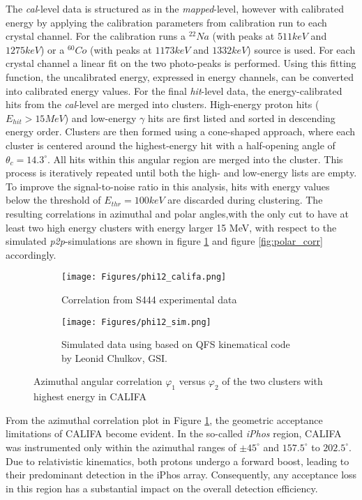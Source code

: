 The \textit{cal}-level data is structured as in the \textit{mapped}-level, however with calibrated energy by applying the calibration parameters from calibration run to each crystal channel.\newline
For the calibration runs a $^{22}Na$ (with peaks at $511keV$ and $1275keV$) or a $^{60}Co$ (with peaks at $1173keV$ and $1332keV$) source is used. For each crystal channel a linear fit on the two photo-peaks is performed. Using this fitting function, the uncalibrated energy, expressed in energy channels, can be converted into calibrated energy values.\newline
For the final \textit{hit}-level data, the energy-calibrated hits from the \textit{cal}-level are merged into clusters. High-energy proton hits ($E_{hit} > 15 MeV$) and low-energy $\gamma$ hits are first listed and sorted in descending energy order. Clusters are then formed using a cone-shaped approach, where each cluster is centered around the highest-energy hit with a half-opening angle of $\theta_c = 14.3^{\circ}$. All hits within this angular region are merged into the cluster. This process is iteratively repeated until both the high- and low-energy lists are empty. To improve the signal-to-noise ratio in this analysis, hits with energy values below the threshold of $E_{thr} = 100keV$ are discarded during clustering.\newline
The resulting correlations in azimuthal and polar angles,with the only cut to have at least two high energy clusters with energy larger 15 MeV, with respect to the simulated \textit{p2p}-simulations are shown in figure \ref{fig:azimuth_corr} and figure \ref{fig:polar_corr} accordingly.\newline
\begin{figure}[htpb]
	\begin{subfigure}[t]{.75\linewidth}
    \texttt{[image: Figures/phi12\_califa.png]}
	\caption{Correlation from S444 experimental data}
	\end{subfigure}
	\begin{subfigure}[t]{.75\linewidth}
    \texttt{[image: Figures/phi12\_sim.png]}
	\caption{Simulated data using based on QFS kinematical code by Leonid Chulkov, GSI.}
	\end{subfigure}
    \caption{Azimuthal angular correlation $\varphi_1$ versus $\varphi_2$ of the two clusters with highest energy in CALIFA }
    \label{fig:azimuth_corr}
\end{figure}
From the azimuthal correlation plot in Figure \ref{fig:azimuth_corr}, the geometric acceptance limitations of CALIFA become evident. In the so-called \textit{iPhos} region, CALIFA was instrumented only within the azimuthal ranges of $\pm 45^{\circ}$ and $157.5^{\circ}$ to $202.5^{\circ}$. Due to relativistic kinematics, both protons undergo a forward boost, leading to their predominant detection in the iPhos array. Consequently, any acceptance loss in this region has a substantial impact on the overall detection efficiency.\newline
